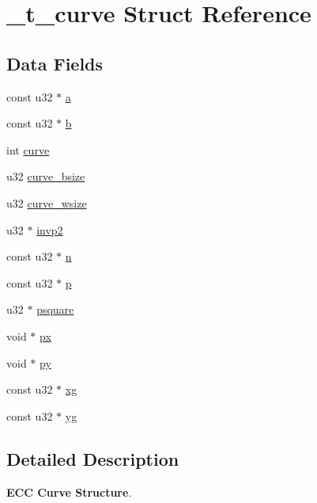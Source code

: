 \hypertarget{struct__t__curve}{\section{\+\_\+t\+\_\+curve Struct Reference}
\label{struct__t__curve}
}
\subsection*{Data Fields}
\begin{DoxyCompactItemize}
\item
const u32 $\ast$ \hyperlink{struct__t__curve_a88955062c39051a3125096467bc4ab29}{a}
\item
const u32 $\ast$ \hyperlink{struct__t__curve_a8b6702ad371684048f47db647567c59f}{b}
\item
int \hyperlink{struct__t__curve_ad61e4ff482e52b3da8c2f5e13dc3c73d}{curve}
\item
u32 \hyperlink{struct__t__curve_a9bbec58f3c4e0242f4a35e5a074e8157}{curve\+\_\+bsize}
\item
u32 \hyperlink{struct__t__curve_a197249f7a6676b30ff0a587d2840d6bb}{curve\+\_\+wsize}
\item
u32 $\ast$ \hyperlink{struct__t__curve_af069f02c44aabbf48a58630e66a45881}{invp2}
\item
const u32 $\ast$ \hyperlink{struct__t__curve_a47b7adf4fa2a08459833020659e6a504}{n}
\item
const u32 $\ast$ \hyperlink{struct__t__curve_ad19e9ad5fa75d3a5f3e691c3ed9627b5}{p}
\item
u32 $\ast$ \hyperlink{struct__t__curve_adb489f0d60e4689407b67e1b45cb1848}{psquare}
\item
void $\ast$ \hyperlink{struct__t__curve_affdf78baef4434da522f1b63632bd17e}{px}
\item
void $\ast$ \hyperlink{struct__t__curve_aed69d60ec1a2d98bd79d9d35386558eb}{py}
\item
const u32 $\ast$ \hyperlink{struct__t__curve_ac386d0e2f79d9a0298b32b5f401a4215}{xg}
\item
const u32 $\ast$ \hyperlink{struct__t__curve_aefd5cee3d48669caaf076f0c596ba644}{yg}
\end{DoxyCompactItemize}


\subsection{Detailed Description}
{\bfseries E\+C\+C Curve Structure}.

